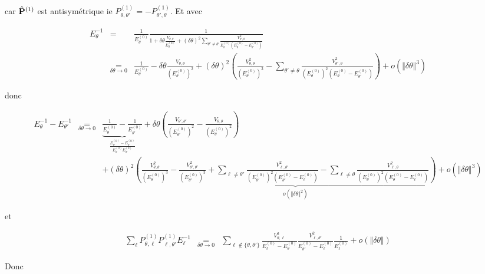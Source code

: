 car $\hat{\mathbf{P}}^{(1)}$ est antisymétrique ie $P_{\theta,\theta'}^{(1)} = -P_{\theta',\theta}^{(1)}$. Et avec 

\begin{eqnarray*}
	E_\theta^{-1} & = & \frac{1}{E_\theta^{(0)}} \frac{1}{ 1 + \delta \theta \frac{V_{\theta,\theta}}{ E_\theta^{(0)}}  + (\delta  \theta)^2 \sum_{\theta' \neq \theta} \frac{ V_{\theta',\theta}^2}{E_\theta^{(0)} ( E_\theta^{(0)} - E_{\theta'}^{(0)})	}	}\\
	& \underset{\delta \theta \to 0 }{=} & \frac{1}{E_\theta^{(0)}} - \delta \theta \frac{V_{\theta,\theta}}{ (E_\theta^{(0)})^2} + ( \delta \theta )^2  \left ( \frac{V_{\theta,\theta}^2}{ (E_\theta^{(0)})^3} - \sum_{\theta' \neq \theta} \frac{ V_{\theta',\theta}^2}{(E_\theta^{(0)})^2 ( E_\theta^{(0)} - E_{\theta'}^{(0)})	}\right) + o ( \Vert \delta \theta\Vert^3 ) 
\end{eqnarray*}

donc 

\begin{eqnarray*}
	E_\theta^{-1} - E_{\theta'}^{-1}	 & \underset{\delta \theta \to 0 }{=} &	 \underbrace{\frac{1}{E_\theta^{(0)}} - \frac{1}{E_{\theta'}^{(0)}}}_{\frac{E_{\theta'}^{(0)}-E_{\theta}^{(0)}}{E_{\theta}^{(0)}E_{\theta'}^{(0)}}} + \delta \theta \left ( \frac{V_{\theta',\theta'}}{ (E_{\theta'}^{(0)})^2} - \frac{V_{\theta,\theta}}{ (E_\theta^{(0)})^2}\right ) \\
	& & + \underbrace{(\delta \theta )^2 \left ( \frac{V_{\theta,\theta}^2}{ (E_\theta^{(0)})^3} - \frac{V_{\theta',\theta'}^2}{ (E_{\theta'}^{(0)})^3} + \sum_{\ell \neq \theta'} \frac{ V_{\ell,\theta'}^2}{(E_{\theta'}^{(0)})^2 ( E_{\theta'}^{(0)} - E_{\ell}^{(0)})	} - \sum_{\ell \neq \theta} \frac{ V_{\ell,\theta}^2}{(E_\theta^{(0)})^2 ( E_\theta^{(0)} - E_{\ell}^{(0)})	}\right ) + o ( \Vert \delta \theta \Vert^3 ) }_{ o ( \Vert \delta \theta \Vert^2 )}
\end{eqnarray*}

et 

\begin{eqnarray*}
	\sum_\ell P_{\theta,\ell}^{(1)}P_{\ell,\theta'}^{(1)}  E_{\ell}^{-1} & \underset{\delta \theta \to 0 }{=} &	 \sum_{\ell \notin \{ \theta , \theta' \} } 	\frac{ V_{\theta,\ell}^2}{E_\ell^{(0)} - 	E_{\theta}^{(0)}} 	\frac{ V_{\ell,\theta'}^2}{E_{\theta'}^{(0)} - 	E_\ell^{(0)}} \frac{1}{E_\ell^{(0)}}  + o (\Vert \delta \theta \Vert ) 
\end{eqnarray*}

Donc 


